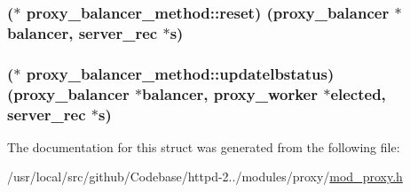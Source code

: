 \subsubsection[{\texorpdfstring{reset}{reset}}]{($\ast$ proxy\+\_\+balancer\+\_\+method\+::reset) ({\bf proxy\+\_\+balancer} $\ast${\bf balancer}, {\bf server\+\_\+rec} $\ast${\bf s})}\hypertarget{structproxy__balancer__method_a69235b22019397425d2bc4ea3059fe85}{}\label{structproxy__balancer__method_a69235b22019397425d2bc4ea3059fe85}
\subsubsection[{\texorpdfstring{updatelbstatus}{updatelbstatus}}]{($\ast$ proxy\+\_\+balancer\+\_\+method\+::updatelbstatus) ({\bf proxy\+\_\+balancer} $\ast${\bf balancer}, {\bf proxy\+\_\+worker} $\ast$elected, {\bf server\+\_\+rec} $\ast${\bf s})}\hypertarget{structproxy__balancer__method_adfbccbb12f625e1f5e485dab605366e2}{}\label{structproxy__balancer__method_adfbccbb12f625e1f5e485dab605366e2}


The documentation for this struct was generated from the following file\+:\begin{DoxyCompactItemize}
\item 
/usr/local/src/github/\+Codebase/httpd-\/2../modules/proxy/\hyperlink{mod__proxy_8h}{mod\+\_\+proxy.\+h}\end{DoxyCompactItemize}
